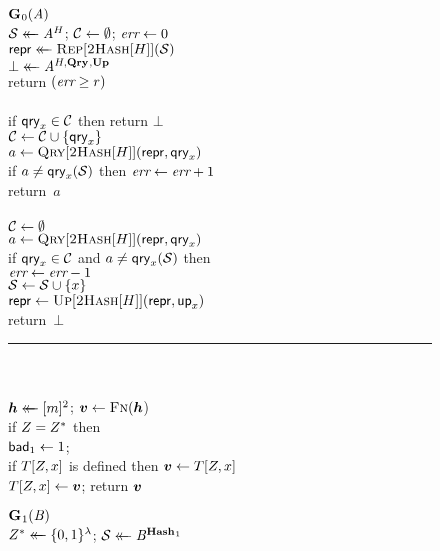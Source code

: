 \begin{figure}
  {
    \underline{$\mathbf{G}\hspace{0.5pt}_0(\mathit{A})$}\\[2pt]
      $\mathcal{S} \mathrel{\leftarrow\mkern-14mu\leftarrow} \mathit{A}^H$; $\mathcal{C} \gets \emptyset$; $\textit{err} \gets 0$\\
      $\mathsf{repr} \mathrel{\leftarrow\mkern-14mu\leftarrow} \textsc{Rep}[\textsc{2Hash}[H]](\mathcal{S})$\\
      $\bot \mathrel{\leftarrow\mkern-14mu\leftarrow} \mathit{A}^{H,\mathbf{Qry}\hspace{0.5pt},\mathbf{Up}\hspace{0.5pt}}$\\
      return $(\textit{err} \geq r)$
    \\[6pt]
    \\[2pt]
      if $\mathsf{qry}_x \in \mathcal{C}$ then return $\bot$\\
      $\mathcal{C} \gets \mathcal{C} \cup \{\mathsf{qry}_x\}$\\
      $a \gets \textsc{Qry}[\textsc{2Hash}[H]](\mathsf{repr}, \mathsf{qry}_x)$\\
      if $a \neq \mathsf{qry}_x(\mathcal{S})$ then $\textit{err} \gets \textit{err} + 1$\\
      return~$a$
    \\[6pt]
    \\[2pt]
      $\mathcal{C} \gets \emptyset$\\
      $a \gets \textsc{Qry}[\textsc{2Hash}[H]](\mathsf{repr}, \mathsf{qry}_x)$\\
      if $\mathsf{qry}_x \in \mathcal{C}$ and $a \neq \mathsf{qry}_x(\mathcal{S})$ then\\
      \tab $\textit{err} \gets \textit{err}-1$\\
      $\mathcal{S} \gets \mathcal{S} \cup \{x\}$\\
      $\mathsf{repr} \gets \textsc{Up}[\textsc{2Hash}[H]](\mathsf{repr},\mathsf{up}_x)$\\
      return~$\bot$
    \\[4pt]
    \hspace*{-4pt}\rule{1.043\textwidth}{.4pt}
    \\[5pt]
     \hfill{}\hspace*{3pt}\\
      $\hh \getsr [m]^2$; $\vv \gets \fff(\hh$)\\
      if $Z = Z^*$ then\\
      \tab $\mathsf{bad}_1 \gets 1$; \\
      if $T[Z,x]$ is defined then $\vv \gets T[\salt,x]$\\
      $T[\salt,x] \gets \vv$;
      return $\vv$
  }
  {
    \underline{$\mathbf{G}\hspace{0.5pt}_1(\mathit{B})$}\\[2pt]
      $Z^* \mathrel{\leftarrow\mkern-14mu\leftarrow} \{0,1\}^\lambda$;
      $\mathcal{S} \mathrel{\leftarrow\mkern-14mu\leftarrow} \mathit{B}^{\mathbf{Hash}\hspace{0.5pt}_1}$\\
}
\end{figure}
